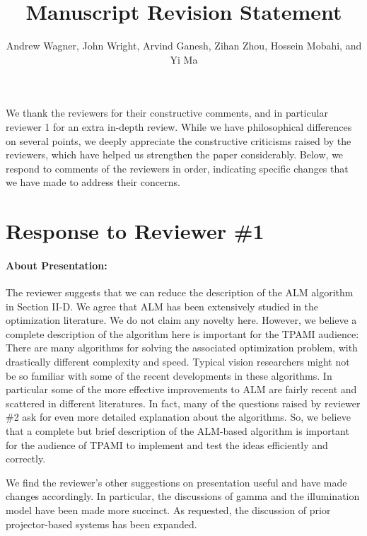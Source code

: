 \documentclass[11pt]{article}
\begin{document}
   

   \title{\Large {\bf Manuscript  Revision Statement}}

       \author{{Andrew Wagner, John Wright, Arvind Ganesh, Zihan Zhou, Hossein Mobahi, and Yi Ma}}

   \date{}
   \maketitle

We thank the reviewers for their constructive comments, and in particular
reviewer 1 for an extra in-depth review.  While we have philosophical
differences on several points, we deeply appreciate the constructive
criticisms raised by the reviewers, which have helped us strengthen the paper considerably.
Below, we respond to comments of the reviewers in order, indicating
specific changes that we have made to address their concerns.


\section{Response to Reviewer \#1}

\paragraph{About Presentation:} The reviewer suggests that we can reduce the description
of the ALM algorithm in Section II-D. We agree that ALM has been extensively studied in the optimization
literature. We do not claim any novelty here. However, we believe a complete description of the algorithm
here is important for the TPAMI audience: There are
many algorithms for solving the associated optimization problem, with drastically different complexity
and speed. Typical vision researchers might not be so familiar with some of the recent
developments in these algorithms. In particular some of the more effective improvements to ALM are fairly
recent and scattered in different literatures. In fact, many of the questions raised by reviewer \#2
ask for even more detailed explanation about the algorithms. So, we believe that a complete but brief
description of the ALM-based algorithm is important for the audience of TPAMI to implement and
test the ideas efficiently and correctly.

We find the reviewer's other suggestions on presentation useful and have made changes accordingly. 
In particular, the discussions of gamma and the illumination model have been made more succinct.  As
requested, the discussion of prior projector-based systems has been expanded.
\end{document}
